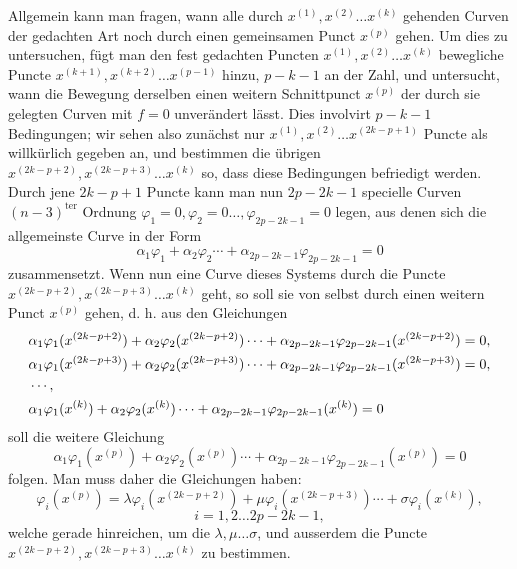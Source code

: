 \documentclass[10pt]{article}
\begin{document}
Allgemein kann man fragen, wann alle durch \(x^{(1)},x^{(2)}\ldots x^{(k)}\) gehenden Curven der gedachten Art noch durch einen gemeinsamen Punct \(x^{(p)}\) gehen. Um dies zu untersuchen, fügt man den fest gedachten Puncten \(x^{(1)},x^{(2)}\ldots x^{(k)}\) bewegliche Puncte \(x^{(k+1)},x^{(k+2)}\ldots x^{(p-1)}\) hinzu, \(p-k-1\) an der Zahl, und untersucht, wann die Bewegung derselben einen weitern Schnittpunct \(x^{(p)}\) der durch sie gelegten Curven mit \(f=0\) unverändert lässt. Dies involvirt \(p-k-1\) Bedingungen; wir sehen also zunächst nur \(x^{(1)},x^{(2)}\ldots x^{(2k-p+1)}\) Puncte als willkürlich gegeben an, und bestimmen die übrigen \(x^{(2k-p+2)},x^{(2k-p+3)}\ldots x^{(k)}\) so, dass diese Bedingungen befriedigt werden. Durch jene \(2k-p+1\) Puncte kann man nun \(2p-2k-1\) specielle Curven \((n-3)^{\mathrm{ter}}\) Ordnung \(\varphi_1=0,\varphi_2=0\ldots,\varphi_{2p-2k-1}=0\) legen, aus denen sich die allgemeinste Curve in der Form
\[
\alpha_1\varphi_1+\alpha_2\varphi_2\cdots+\alpha_{2p-2k-1}\varphi_{2p-2k-1}=0
\]
zusammensetzt. Wenn nun eine Curve dieses Systems durch die Puncte \(x^{(2k-p+2)},x^{(2k-p+3)}\ldots x^{(k)}\) geht, so soll sie von selbst durch einen weitern Punct \(x^{(p)}\) gehen, d. h. aus den Gleichungen
\[
\begin{aligned}
&\alpha_1\varphi_1(x^{(2k-p+2)})+\alpha_2\varphi_2(x^{(2k-p+2)})\cdots+
\alpha_{2p-2k-1}\varphi_{2p-2k-1}(x^{(2k-p+2)})=0,\\
&\alpha_1\varphi_1(x^{(2k-p+3)})+\alpha_2\varphi_2(x^{(2k-p+3)})\cdots+
\alpha_{2p-2k-1}\varphi_{2p-2k-1}(x^{(2k-p+3)})=0,\\
&\hfill\cdots\hfill,\\
&\alpha_1\varphi_1(x^{(k)})+\alpha_2\varphi_2(x^{(k)})\cdots+
\alpha_{2p-2k-1}\varphi_{2p-2k-1}(x^{(k)})=0
\end{aligned}
\]
soll die weitere Gleichung
\[
\alpha_1\varphi_1(x^{(p)})+\alpha_2\varphi_2(x^{(p)})\cdots+
\alpha_{2p-2k-1}\varphi_{2p-2k-1}(x^{(p)})=0
\]
folgen. Man muss daher die Gleichungen haben:
\[
\varphi_i(x^{(p)})=\lambda\varphi_i(x^{(2k-p+2)})+
\mu\varphi_i(x^{(2k-p+3)})\cdots+
\sigma\varphi_i(x^{(k)}),
\]
\[
i=1,2\ldots 2p-2k-1,
\]
welche gerade hinreichen, um die \(\lambda,\mu\ldots\sigma\), und ausserdem die Puncte \(x^{(2k-p+2)},x^{(2k-p+3)}\ldots x^{(k)}\) zu bestimmen.
\end{document}
